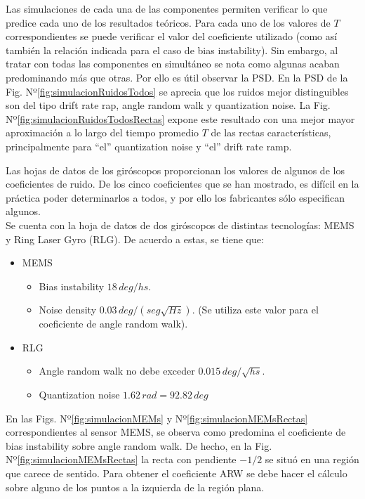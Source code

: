 \documentclass[a4paper,11pt,twoside]{IT-CNEA}
\begin{document}
\par Las simulaciones de cada una de las componentes permiten verificar lo que predice cada uno de los resultados teóricos. Para cada uno de los valores de $T$ correspondientes se puede verificar el valor del coeficiente utilizado (como así también la relación indicada para el caso de bias instability). Sin embargo, al tratar con todas las componentes en simultáneo se nota como algunas acaban predominando más que otras. Por ello es útil observar la PSD. En la PSD de la Fig. Nº\ref{fig:simulacionRuidosTodos} se aprecia que los ruidos mejor distinguibles son del tipo drift rate rap, angle random walk y quantization noise. La Fig. Nº\ref{fig:simulacionRuidosTodosRectas} expone este resultado con una mejor mayor aproximación  a lo largo del tiempo promedio $T$ de las rectas características, principalmente para ``el'' quantization noise y ``el'' drift rate ramp.
\par Las hojas de datos de los giróscopos proporcionan los valores de algunos de los coeficientes de ruido. De los cinco coeficientes que se han mostrado, es difícil en la práctica poder determinarlos a todos, y por ello los fabricantes sólo especifican algunos.
\\ Se cuenta con la hoja de datos de dos giróscopos de distintas tecnologías: MEMS y Ring Laser Gyro (RLG). De acuerdo a estas, se tiene que:
\begin{itemize}
\item MEMS
\begin{itemize}
\item Bias instability $18\,deg/hs$.
\item Noise density $0.03\,deg/\left( seg\sqrt{Hz}\right)$. (Se utiliza este valor para el coeficiente de angle random walk).
\end{itemize}
\item RLG
\begin{itemize}
\item Angle random walk no debe exceder $0.015\,deg/\sqrt{hs}$.
\item Quantization noise $1.62\,rad=92.82\,deg$
\end{itemize}
\end{itemize}
En las Figs. Nº\ref{fig:simulacionMEMs} y Nº\ref{fig:simulacionMEMsRectas} correspondientes al sensor MEMS, se observa como predomina el coeficiente de bias instability sobre angle random walk. De hecho, en la Fig. Nº\ref{fig:simulacionMEMsRectas} la recta con pendiente $-1/2$ se situó en una región que carece de sentido. Para obtener el coeficiente ARW se debe hacer el cálculo sobre alguno de los puntos a la izquierda de la región plana. 
\end{document}
